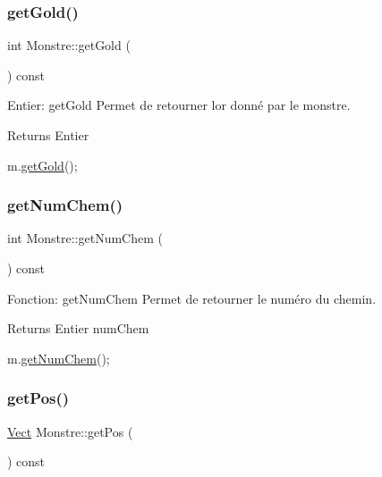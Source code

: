 \subsubsection{\texorpdfstring{get\+Gold()}{getGold()}}
{\footnotesize\ttfamily int Monstre\+::get\+Gold (\begin{DoxyParamCaption}{ }\end{DoxyParamCaption}) const}



Entier\+: get\+Gold Permet de retourner l\textquotesingle{}or donné par le monstre. 

\begin{DoxyReturn}{Returns}
Entier 
\begin{DoxyCode}
m.\hyperlink{classMonstre_a4a71cce5e0825e0e331bfdd3538a9b30}{getGold}();
\end{DoxyCode}
 
\end{DoxyReturn}
\mbox{\label{classMonstre_ac7998eae7604e8bbfb9aad3b3ea59c33}} 
\subsubsection{\texorpdfstring{get\+Num\+Chem()}{getNumChem()}}
{\footnotesize\ttfamily int Monstre\+::get\+Num\+Chem (\begin{DoxyParamCaption}{ }\end{DoxyParamCaption}) const}



Fonction\+: get\+Num\+Chem Permet de retourner le numéro du chemin. 

\begin{DoxyReturn}{Returns}
Entier num\+Chem 
\begin{DoxyCode}
m.\hyperlink{classMonstre_ac7998eae7604e8bbfb9aad3b3ea59c33}{getNumChem}();
\end{DoxyCode}
 
\end{DoxyReturn}
\mbox{\label{classMonstre_adbe0edd5d97aef18fb44ef163f368be6}} 
\subsubsection{\texorpdfstring{get\+Pos()}{getPos()}}
{\footnotesize\ttfamily \hyperlink{classVect}{Vect} Monstre\+::get\+Pos (\begin{DoxyParamCaption}{ }\end{DoxyParamCaption}) const}



